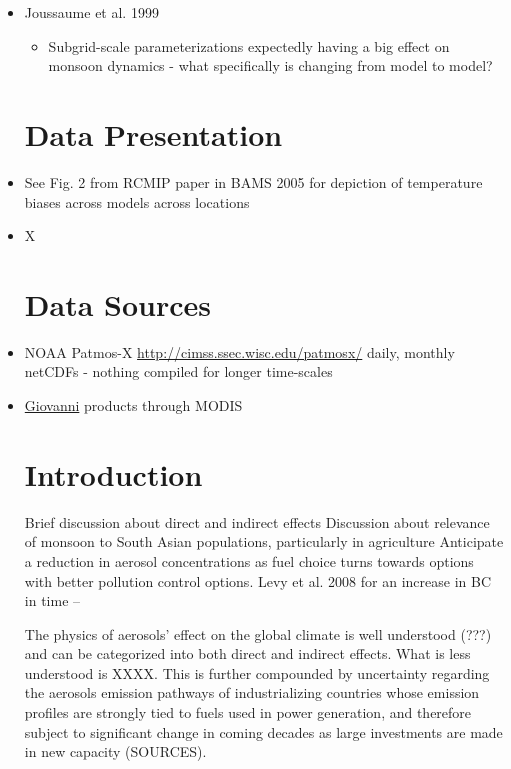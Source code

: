 \documentclass[11pt,reqno]{amsart}
\begin{document}
\begin{itemize}
\item Joussaume et al. 1999 
	\begin{itemize}
	\item Subgrid-scale parameterizations expectedly having a big effect on monsoon dynamics - what specifically is changing from model to model?  
	
	
	\end{itemize}


\section{Data Presentation}
\item See Fig. 2 from RCMIP paper in BAMS 2005 for depiction of temperature biases across models across locations 

\item X




\section{Data Sources}
\item NOAA Patmos-X  \href{http://cimss.ssec.wisc.edu/patmosx/}{http://cimss.ssec.wisc.edu/patmosx/} daily, monthly netCDFs - nothing compiled for longer time-scales
\item \href{http://gdata1.sci.gsfc.nasa.gov/daac-bin/G3/gui.cgi?instance_id=MODIS_DAILY_L3&gsid=MODIS_DAILY_L3_160.39.231.134_1402350812&selectedWSID=140235120431683&app=latlonplot_diff&selectedMap=}{Giovanni} products through MODIS 


\section{Introduction}

Brief discussion about direct and indirect effects
Discussion about relevance of monsoon to South Asian populations, particularly in agriculture 
Anticipate a reduction in aerosol concentrations as fuel choice turns towards options with better pollution control options.  
Levy et al. 2008 for an increase in BC in time -- 

The physics of aerosols' effect on the global climate is well understood (???) and can be categorized into both direct and indirect effects.  What is less understood is XXXX.  This is further compounded by uncertainty regarding the aerosols emission pathways of industrializing countries whose emission profiles are strongly tied to fuels used in power generation, and therefore subject to significant change in coming decades as large investments are made in new capacity (SOURCES).  


\end{itemize}
\end{document}
